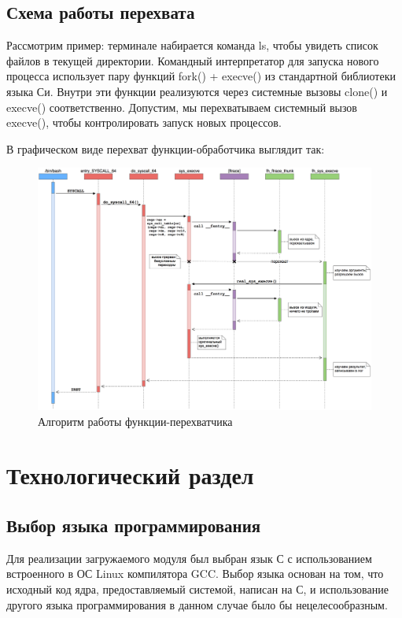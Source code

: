 \documentclass[a4paper,14pt]{extarticle}
\begin{document}
 \subsection{Схема работы перехвата}
 
 Рассмотрим пример: терминале набирается команда ls, чтобы увидеть список файлов в текущей директории. Командный интерпретатор для запуска нового процесса использует пару функций fork() + execve() из стандартной библиотеки языка Си. Внутри эти функции реализуются через системные вызовы clone() и execve() соответственно. Допустим, мы перехватываем системный вызов execve(), чтобы контролировать запуск новых процессов.
 
 \newpage
 
 В графическом виде перехват функции-обработчика выглядит так:
 \begin{figure}[h!]
 	\centering
 	\includegraphics[width=1.0\textwidth]{img/hook_work_scheme.png}
 	\caption{Алгоритм работы функции-перехватчика}
 	\label{fig:spire00}
 \end{figure}
 
 \newpage
 
 \section{Технологический раздел}
 
 \subsection{Выбор языка программирования}
 
 Для реализации загружаемого модуля был выбран язык С с использованием встроенного в ОС Linux компилятора GCC. Выбор языка основан на том, что исходный код ядра, предо­ставляемый системой, написан на С, и использование другого языка программиро­вания в данном случае было бы нецелесообразным.
\end{document}
